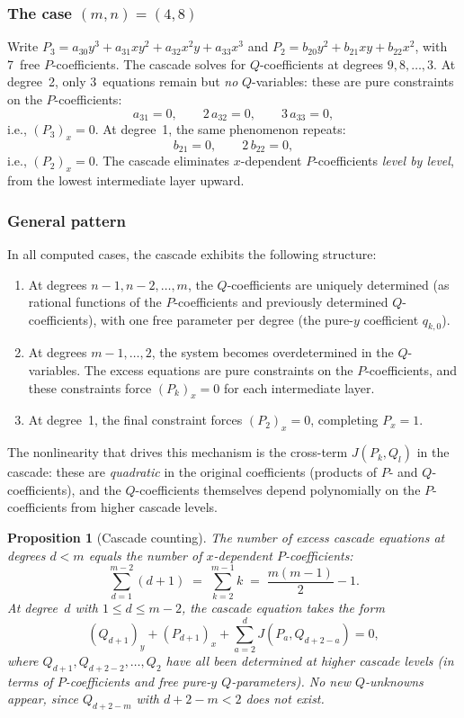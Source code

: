 \documentclass[12pt,a4paper]{article}
\newtheorem{proposition}[theorem]{Proposition}
\theoremstyle{definition}
\begin{document}
\subsubsection*{The case $(m,n) = (4,8)$}

Write $P_3 = a_{30}y^3 + a_{31}xy^2 + a_{32}x^2y + a_{33}x^3$ and
$P_2 = b_{20}y^2 + b_{21}xy + b_{22}x^2$, with 7~free $P$-coefficients.
The cascade solves for $Q$-coefficients at degrees $9, 8, \ldots, 3$. At
degree~2, only 3~equations remain but \emph{no} $Q$-variables: these are pure
constraints on the $P$-coefficients:
\[
  a_{31} = 0, \qquad 2\,a_{32} = 0, \qquad 3\,a_{33} = 0,
\]
i.e., $(P_3)_x = 0$. At degree~1, the same phenomenon repeats:
\[
  b_{21} = 0, \qquad 2\,b_{22} = 0,
\]
i.e., $(P_2)_x = 0$. The cascade eliminates $x$-dependent $P$-coefficients
\emph{level by level}, from the lowest intermediate layer upward.

\subsubsection*{General pattern}

In all computed cases, the cascade exhibits the following structure:
\begin{enumerate}
\item At degrees $n-1, n-2, \ldots, m$, the $Q$-coefficients are uniquely
  determined (as rational functions of the $P$-coefficients and previously
  determined $Q$-coefficients), with one free parameter per degree (the
  pure-$y$ coefficient $q_{k,0}$).
\item At degrees $m-1, \ldots, 2$, the system becomes overdetermined in the
  $Q$-variables. The excess equations are pure constraints on the $P$-coefficients,
  and these constraints force $(P_k)_x = 0$ for each intermediate layer.
\item At degree~1, the final constraint forces $(P_2)_x = 0$, completing
  $P_x = 1$.
\end{enumerate}
The nonlinearity that drives this mechanism is the cross-term $J(P_k, Q_l)$
in the cascade: these are \emph{quadratic} in the original coefficients (products
of $P$- and $Q$-coefficients), and the $Q$-coefficients themselves depend
polynomially on the $P$-coefficients from higher cascade levels.

\begin{proposition}[Cascade counting]\label{prop:cascade-count}
The number of excess cascade equations at degrees $d < m$ equals the number
of $x$-dependent $P$-coefficients:
\[
  \sum_{d=1}^{m-2} (d+1) \;=\; \sum_{k=2}^{m-1} k \;=\; \frac{m(m-1)}{2} - 1.
\]
At degree~$d$ with $1 \leq d \leq m-2$, the cascade equation takes the form
\[
  (Q_{d+1})_y + (P_{d+1})_x + \sum_{a=2}^{d} J(P_a, Q_{d+2-a}) = 0,
\]
where $Q_{d+1}, Q_{d+2-2}, \ldots, Q_2$ have all been determined at higher
cascade levels (in terms of $P$-coefficients and free pure-$y$
$Q$-parameters). No new $Q$-unknowns appear, since $Q_{d+2-m}$ with
$d+2-m < 2$ does not exist.
\end{proposition}
\end{document}
